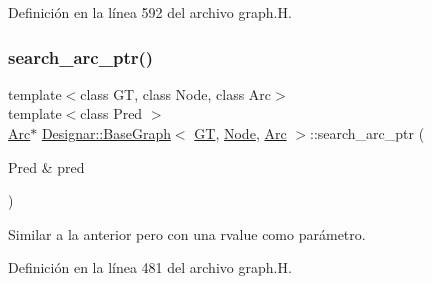 Definición en la línea 592 del archivo graph.\+H.

\mbox{\label{class_designar_1_1_base_graph_afcbc602350567bc5a377fd7fc94419ae}} 
\subsubsection{\texorpdfstring{search\+\_\+arc\+\_\+ptr()}{search\_arc\_ptr()}\hspace{0.1cm}{\footnotesize\ttfamily [1/2]}}
{\footnotesize\ttfamily template$<$class GT, class Node, class Arc$>$ \\
template$<$class Pred $>$ \\
\hyperlink{namespace_designar_a3f55fb5513d62ff47cbc8f72b8e95d6f}{Arc}$\ast$ \hyperlink{class_designar_1_1_base_graph}{Designar\+::\+Base\+Graph}$<$ \hyperlink{demo-buildgraph_8_c_a3001c40d2c31ca87ed96cd7d1334a55e}{GT}, \hyperlink{namespace_designar_a5af326c65aa2bd26b26c410f2030d09e}{Node}, \hyperlink{namespace_designar_a3f55fb5513d62ff47cbc8f72b8e95d6f}{Arc} $>$\+::search\+\_\+arc\+\_\+ptr (\begin{DoxyParamCaption}\item[{Pred \&}]{pred }\end{DoxyParamCaption})\hspace{0.3cm}{\ttfamily [inline]}}



Similar a la anterior pero con una rvalue como parámetro. 



Definición en la línea 481 del archivo graph.\+H.

\mbox{\label{class_designar_1_1_base_graph_a4ffe61f2548a892d070aa46609c4532c}} 
